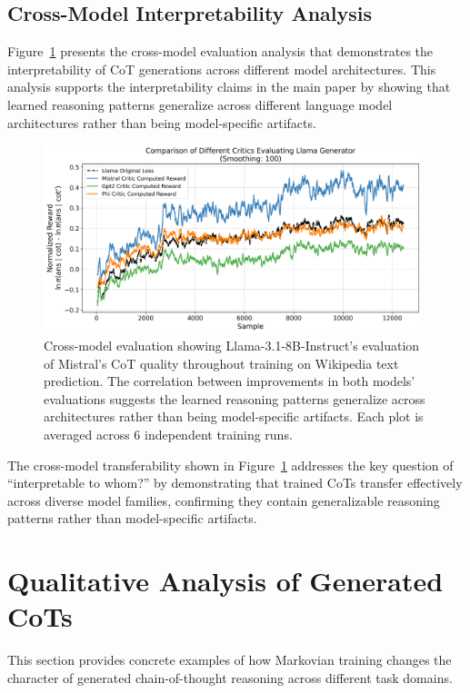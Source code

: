 \documentclass{article}
\begin{document}
\subsection{Cross-Model Interpretability Analysis}
Figure~\ref{fig:wiki_cross_model} presents the cross-model evaluation analysis that demonstrates the interpretability of CoT generations across different model architectures. This analysis supports the interpretability claims in the main paper by showing that learned reasoning patterns generalize across different language model architectures rather than being model-specific artifacts.

\begin{figure}[ht]
    \centering
    \includegraphics[width=0.98\textwidth]{Figures/wiki_multi_critic_comparison.png}
    \caption{Cross-model evaluation showing Llama-3.1-8B-Instruct's evaluation of Mistral's CoT quality throughout training on Wikipedia text prediction. The correlation between improvements in both models' evaluations suggests the learned reasoning patterns generalize across architectures rather than being model-specific artifacts. Each plot is averaged across 6 independent training runs.}
    \label{fig:wiki_cross_model}
\end{figure}

The cross-model transferability shown in Figure~\ref{fig:wiki_cross_model} addresses the key question of ``interpretable to whom?'' by demonstrating that trained CoTs transfer effectively across diverse model families, confirming they contain generalizable reasoning patterns rather than model-specific artifacts.

\section{Qualitative Analysis of Generated CoTs}
This section provides concrete examples of how Markovian training changes the character of generated chain-of-thought reasoning across different task domains.
\end{document}
